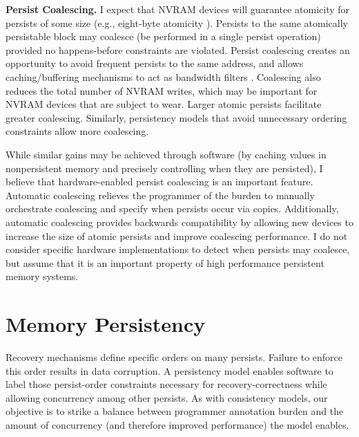 \textbf{Persist Coalescing.}
I expect that NVRAM devices will guarantee atomicity for persists of some size (e.g., eight-byte atomicity \cite{Condit09}).
Persists to the same atomically persistable block may coalesce (be performed in a single persist operation) provided no happens-before constraints are violated. 
Persist coalescing creates an opportunity to avoid frequent persists to the same address, and allows caching/buffering mechanisms to act as bandwidth filters \cite{Goodman83}.
Coalescing also reduces the total number of NVRAM writes, which may be important for NVRAM devices that are subject to wear.
Larger atomic persists facilitate greater coalescing.
Similarly, persistency models that avoid unnecessary ordering constraints allow more coalescing. 

While similar gains may be achieved through software (by caching values in nonpersistent memory and precisely controlling when they are persisted), I believe that hardware-enabled persist coalescing is an important feature.
Automatic coalescing relieves the programmer of the burden to manually orchestrate coalescing and specify when persists occur via copies.
Additionally, automatic coalescing provides backwards compatibility by allowing new devices to increase the size of atomic persists and improve coalescing performance.
I do not consider specific hardware implementations to detect when persists may coalesce, but assume that it is an important property of high performance persistent memory systems.

\section{Memory Persistency}
\label{sec:Persistency:Persistency}

Recovery mechanisms define specific orders on many persists.
Failure to enforce this order results in data corruption.
A persistency model enables software to label those persist-order constraints necessary for recovery-correctness while allowing concurrency among other persists.
As with consistency models, our objective is to strike a balance between programmer annotation burden and the amount of concurrency (and therefore improved performance) the model enables.

